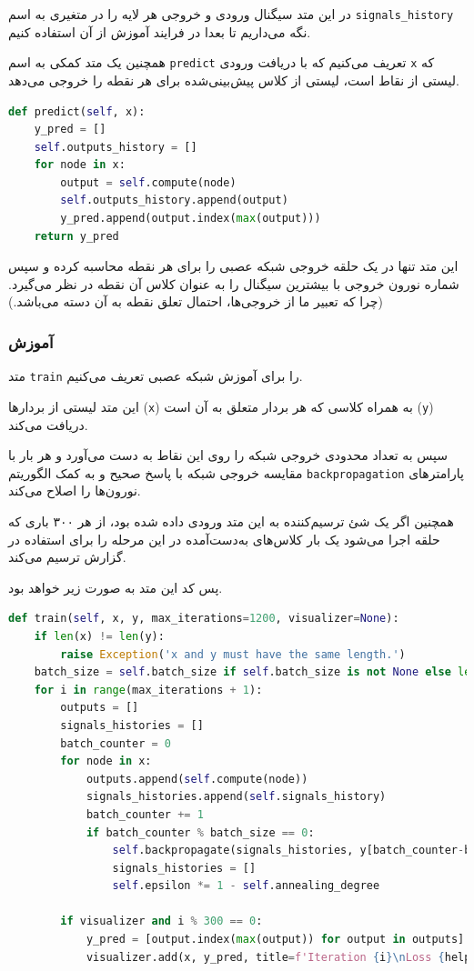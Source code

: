 \documentclass[a4paper, 12pt]{article}
\theoremstyle{definition}
\begin{document}
در این متد سیگنال ورودی و خروجی هر لایه را در متغیری به اسم
\texttt{signals\_history}
نگه می‌داریم تا بعدا در فرایند آموزش از آن استفاده کنیم.

همچنین یک متد کمکی به اسم
\texttt{predict}
تعریف می‌کنیم که با دریافت ورودی
\texttt{x}
که لیستی از نقاط است، لیستی از کلاس پیش‌بینی‌شده برای هر نقطه را خروجی می‌دهد.

\LTR
\begin{lstlisting}[language=Python]
def predict(self, x):
    y_pred = []
    self.outputs_history = []
    for node in x:
        output = self.compute(node)
        self.outputs_history.append(output)
        y_pred.append(output.index(max(output)))
    return y_pred
\end{lstlisting}
\RTL

این متد تنها در یک حلقه خروجی شبکه عصبی را برای هر نقطه محاسبه کرده و سپس شماره نورون خروجی با بیشترین سیگنال را به عنوان کلاس آن نقطه در نظر می‌گیرد. (چرا که تعبیر ما از خروجی‌ها، احتمال تعلق نقطه به آن دسته می‌باشد.)

\subsubsection{آموزش}
متد
\texttt{train}
را برای آموزش شبکه عصبی تعریف می‌کنیم.

این متد لیستی از بردارها
(\texttt{x})
به همراه کلاسی که هر بردار متعلق به آن است
(\texttt{y})
دریافت می‌کند.

سپس به تعداد محدودی خروجی شبکه را روی این نقاط به دست می‌آورد و هر بار با مقایسه خروجی شبکه با پاسخ صحیح و به کمک الگوریتم
\texttt{backpropagation}
پارامترهای نورون‌ها را اصلاح می‌کند.

همچنین اگر یک شئ ترسیم‌کننده به این متد ورودی داده شده بود، از هر ۳۰۰ باری که حلقه اجرا می‌شود یک بار کلاس‌های به‌دست‌آمده در این مرحله را برای استفاده در گزارش ترسیم می‌کند.

پس کد این متد به صورت زیر خواهد بود.

\LTR
\begin{lstlisting}[language=Python]
def train(self, x, y, max_iterations=1200, visualizer=None):
    if len(x) != len(y):
        raise Exception('x and y must have the same length.')
    batch_size = self.batch_size if self.batch_size is not None else len(x)
    for i in range(max_iterations + 1):
        outputs = []
        signals_histories = []
        batch_counter = 0
        for node in x:
            outputs.append(self.compute(node))
            signals_histories.append(self.signals_history)
            batch_counter += 1
            if batch_counter % batch_size == 0:
                self.backpropagate(signals_histories, y[batch_counter-batch_size:batch_counter])
                signals_histories = []
                self.epsilon *= 1 - self.annealing_degree

        if visualizer and i % 300 == 0:
            y_pred = [output.index(max(output)) for output in outputs]
            visualizer.add(x, y_pred, title=f'Iteration {i}\nLoss {helpers.loss(y, outputs)}')
\end{lstlisting}
\RTL
\end{document}

